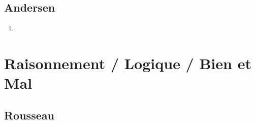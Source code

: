 \documentclass[a4paper, 11pt, hidelinks]{article}
\begin{document}
\subsection{Andersen}


\begin{enumerate}
    \item 
\end{enumerate}














































\section{Raisonnement / Logique / Bien et Mal}



\subsection{Rousseau}
\end{document}
